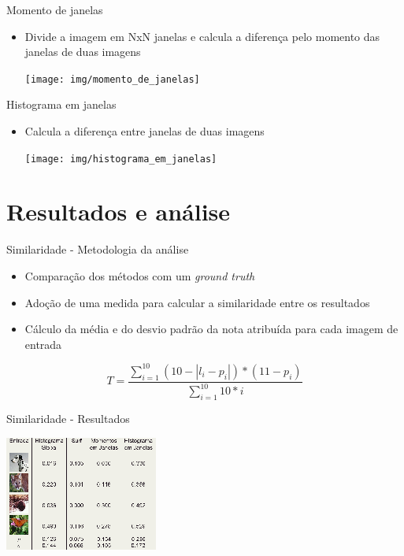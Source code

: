 \documentclass[
    style=paintings,
    paper=screen,
    blackslide,
    nopagebreaks,
    fleqn
]{powerdot}
\begin{document}
\begin{slide}{Momento de janelas}
\begin{itemize}[type=1]
\item <1-> Divide a imagem em NxN janelas e calcula a diferença pelo momento
das janelas de duas imagens
\begin{center}
\texttt{[image: img/momento\_de\_janelas]}
\end{center}
\end{itemize}
\end{slide}


\begin{slide}{Histograma em janelas}
\begin{itemize}[type=1]
\item <1-> Calcula a diferença entre janelas de duas imagens
\begin{center}
\texttt{[image: img/histograma\_em\_janelas]}
\end{center}
\end{itemize}
\end{slide}


\section[slide=false]{Resultados e análise}
\begin{slide}{Similaridade - Metodologia da análise}
\begin{itemize}[type=1]
\item <1-> Comparação dos métodos com um \it{ground truth}
\item <2-> Adoção de uma medida para calcular a similaridade entre os resultados 
\item <3-> Cálculo da média e do desvio padrão da nota atribuída para cada imagem de entrada 
\end{itemize}
\pause$$T = \frac{\sum\limits_{i=1}^{10}(10-|l_i-p_i|) * (11-p_i)}{\sum\limits_{i=1}^{10}10*i}$$
\end{slide}


\begin{slide}{Similaridade - Resultados}
\begin{center}
\includegraphics[width=0.8\slidewidth]{img/tabela1}
\end{center}
\end{slide}
\end{document}
